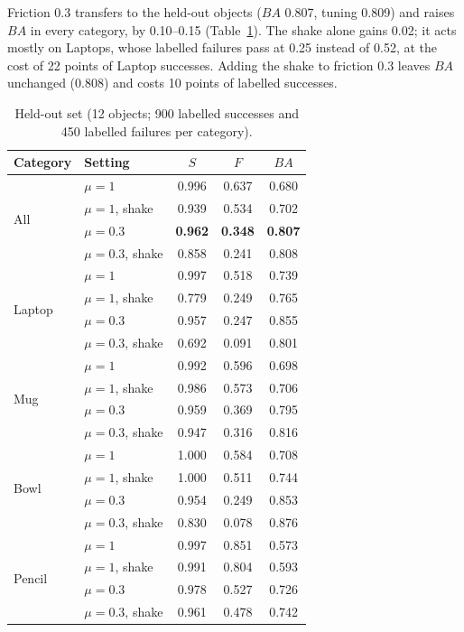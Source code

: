 \documentclass[conference]{IEEEtran}
\begin{document}
Friction 0.3 transfers to the held-out objects ($\mathit{BA}$ 0.807, tuning 0.809) and raises
$\mathit{BA}$ in every category, by 0.10--0.15 (Table~\ref{tab:heldout}). The shake alone gains 0.02; it
acts mostly on Laptops, whose labelled failures pass at 0.25 instead of 0.52, at the cost of 22 points of
Laptop successes. Adding the shake to friction 0.3
leaves $\mathit{BA}$ unchanged (0.808) and costs 10 points of labelled successes.

\begin{table}[!h]
  \centering
  \caption{Held-out set (12 objects; 900 labelled successes and 450 labelled failures per category).}
  \label{tab:heldout}
  \begin{tabular}{@{}llccc@{}}
    \toprule
    Category & Setting & $S$ & $F$ & $\mathit{BA}$ \\
    \midrule
    \multirow{4}{*}{All} & $\mu{=}1$ & 0.996 & 0.637 & 0.680 \\
     & $\mu{=}1$, shake & 0.939 & 0.534 & 0.702 \\
     & $\mu{=}0.3$ & \textbf{0.962} & \textbf{0.348} & \textbf{0.807} \\
     & $\mu{=}0.3$, shake & 0.858 & 0.241 & 0.808 \\
    \midrule
    \multirow{4}{*}{Laptop} & $\mu{=}1$ & 0.997 & 0.518 & 0.739 \\
     & $\mu{=}1$, shake & 0.779 & 0.249 & 0.765 \\
     & $\mu{=}0.3$ & 0.957 & 0.247 & 0.855 \\
     & $\mu{=}0.3$, shake & 0.692 & 0.091 & 0.801 \\
    \midrule
    \multirow{4}{*}{Mug} & $\mu{=}1$ & 0.992 & 0.596 & 0.698 \\
     & $\mu{=}1$, shake & 0.986 & 0.573 & 0.706 \\
     & $\mu{=}0.3$ & 0.959 & 0.369 & 0.795 \\
     & $\mu{=}0.3$, shake & 0.947 & 0.316 & 0.816 \\
    \midrule
    \multirow{4}{*}{Bowl} & $\mu{=}1$ & 1.000 & 0.584 & 0.708 \\
     & $\mu{=}1$, shake & 1.000 & 0.511 & 0.744 \\
     & $\mu{=}0.3$ & 0.954 & 0.249 & 0.853 \\
     & $\mu{=}0.3$, shake & 0.830 & 0.078 & 0.876 \\
    \midrule
    \multirow{4}{*}{Pencil} & $\mu{=}1$ & 0.997 & 0.851 & 0.573 \\
     & $\mu{=}1$, shake & 0.991 & 0.804 & 0.593 \\
     & $\mu{=}0.3$ & 0.978 & 0.527 & 0.726 \\
     & $\mu{=}0.3$, shake & 0.961 & 0.478 & 0.742 \\
    \bottomrule
  \end{tabular}
\end{table}
\end{document}
